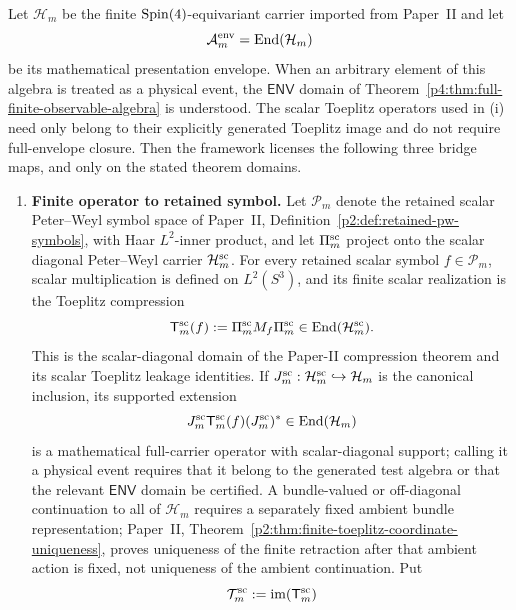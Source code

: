\documentclass[12pt,a4paper]{article}
\begin{document}
\begin{theorem}
\label{p4:thm:three-map-bridge}
Let \(\mathcal H_m\) be the finite \(\mathrm{Spin}(4)\)-equivariant carrier imported from Paper~II and let
\[
\mathcal A_m^{\mathrm{env}}=\operatorname{End}(\mathcal H_m)
\]
be its mathematical presentation envelope.  When an arbitrary element of this
algebra is treated as a physical event, the \(\mathsf{ENV}\) domain of
Theorem~\ref{p4:thm:full-finite-observable-algebra} is understood.  The scalar
Toeplitz operators used in (i) need only belong to their explicitly generated
Toeplitz image and do not require full-envelope closure.
Then the framework licenses the following three bridge maps, and only on the stated theorem domains.

\begin{enumerate}[label=(\roman*), leftmargin=2.3em]
\item \textbf{Finite operator to retained symbol.}
Let \(\mathcal P_m\) denote the retained scalar Peter--Weyl symbol space of
Paper~II, Definition~\ref{p2:def:retained-pw-symbols}, with Haar
\(L^2\)-inner product, and let
\(\Pi_m^{\rm sc}\) project onto the scalar diagonal Peter--Weyl carrier
\(\mathcal H_m^{\rm sc}\).  For every retained scalar symbol
\(f\in\mathcal P_m\), scalar multiplication is defined on
\(L^2(S^3)\), and its finite scalar realization is the Toeplitz compression
\begin{equation}
\label{p4:eq:three-map-toeplitz-realization}
\mathsf T_m^{\rm sc}(f)
:=\Pi_m^{\rm sc}M_f\Pi_m^{\rm sc}
\in\operatorname{End}(\mathcal H_m^{\rm sc}).
\end{equation}
This is the scalar-diagonal domain of the Paper-II compression theorem and
its scalar Toeplitz leakage identities.  If
\(J_m^{\rm sc}:\mathcal H_m^{\rm sc}\hookrightarrow\mathcal H_m\) is the
canonical inclusion, its supported extension
\[
J_m^{\rm sc}\mathsf T_m^{\rm sc}(f)(J_m^{\rm sc})^*
\in\operatorname{End}(\mathcal H_m)
\]
is a mathematical full-carrier operator with scalar-diagonal support; calling
it a physical event requires that it belong to the generated test algebra or
that the relevant \(\mathsf{ENV}\) domain be certified.  A bundle-valued or
off-diagonal continuation to all of \(\mathcal H_m\) requires a separately
fixed ambient bundle representation; Paper~II,
Theorem~\ref{p2:thm:finite-toeplitz-coordinate-uniqueness}, proves uniqueness of the
finite retraction after that ambient action is fixed, not uniqueness of the
ambient continuation.
Put
\[
\mathcal T_m^{\rm sc}:=\operatorname{im}(\mathsf T_m^{\rm sc})
\]
\end{enumerate}
\end{theorem}
\end{document}
